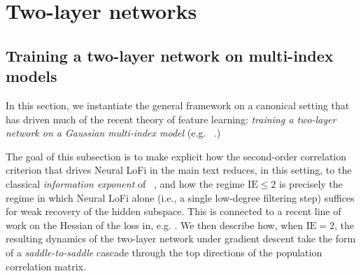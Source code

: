 \section{Two-layer networks}

\label{2605:app:two-layer}

\subsection{Training a two-layer network on multi-index models}\label{2605:app:two-layer-mim}

In this section, we instantiate the general framework on a canonical setting that has driven much of the recent theory of feature learning: \emph{training a two-layer network on a Gaussian multi-index model} (e.g. ~\cite{goldt2019dynamics,benarous2024stochastic,abbe2021staircase,abbe2023sgd,dandi2023how,bietti2022learning,bietti2023learning,arnaboldi2023high,damian2024computational,damian2026generative,dandi2024benefits}.)

The goal of this subsection is to make explicit how the second-order correlation criterion that drives Neural LoFi in the main text reduces, in this setting, to the classical \emph{information exponent} of ~\cite{benarous2024stochastic}, and how the regime $\mathrm{IE}\le 2$ is precisely the regime in which Neural LoFi alone (i.e., a single low-degree filtering step) suffices for weak recovery of the hidden subspace. This is connected to a recent line of work on the Hessian of the loss in, e.g. \cite{bonnaire2025role,zhang2025neural,defilippis2026optimal,montanari2026phase}. We then describe how, when $\mathrm{IE}=2$, the resulting dynamics of the two-layer network under gradient descent take the form of a \emph{saddle-to-saddle} cascade through the top directions of the population correlation matrix.

